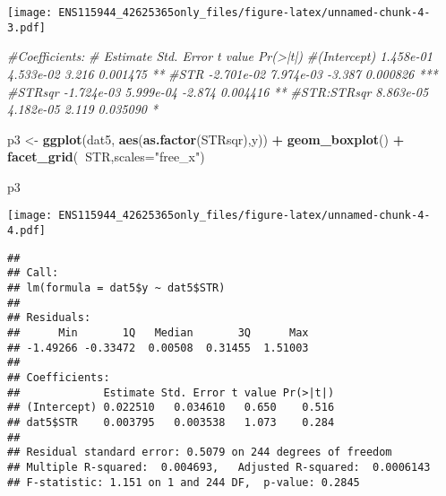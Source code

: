 \documentclass[
]{article}
\newenvironment{Shaded}{\begin{snugshade}}{\end{snugshade}}
\newcommand{\CommentTok}[1]{\textcolor[rgb]{0.56,0.35,0.01}{\textit{#1}}}
\newcommand{\DataTypeTok}[1]{\textcolor[rgb]{0.13,0.29,0.53}{#1}}
\newcommand{\KeywordTok}[1]{\textcolor[rgb]{0.13,0.29,0.53}{\textbf{#1}}}
\newcommand{\NormalTok}[1]{#1}
\newcommand{\OperatorTok}[1]{\textcolor[rgb]{0.81,0.36,0.00}{\textbf{#1}}}
\newcommand{\StringTok}[1]{\textcolor[rgb]{0.31,0.60,0.02}{#1}}
\begin{document}
\texttt{[image: ENS115944\_42625365only\_files/figure-latex/unnamed-chunk-4-3.pdf]}

\begin{Shaded}
\begin{Highlighting}[]
\CommentTok{#Coefficients:}
\CommentTok{#              Estimate Std. Error t value Pr(>|t|)    }
\CommentTok{#(Intercept)  1.458e-01  4.533e-02   3.216 0.001475 ** }
\CommentTok{#STR         -2.701e-02  7.974e-03  -3.387 0.000826 ***}
\CommentTok{#STRsqr      -1.724e-03  5.999e-04  -2.874 0.004416 ** }
\CommentTok{#STR:STRsqr   8.863e-05  4.182e-05   2.119 0.035090 * }


\NormalTok{p3 <-}\StringTok{ }\KeywordTok{ggplot}\NormalTok{(dat5, }\KeywordTok{aes}\NormalTok{(}\KeywordTok{as.factor}\NormalTok{(STRsqr),y)) }\OperatorTok{+}\StringTok{ }\KeywordTok{geom_boxplot}\NormalTok{() }\OperatorTok{+}\StringTok{ }\KeywordTok{facet_grid}\NormalTok{(}\OperatorTok{~}\NormalTok{STR,}\DataTypeTok{scales=}\StringTok{"free_x"}\NormalTok{)}

\NormalTok{p3}
\end{Highlighting}
\end{Shaded}

\texttt{[image: ENS115944\_42625365only\_files/figure-latex/unnamed-chunk-4-4.pdf]}

\begin{Shaded}
\end{Shaded}

\begin{verbatim}
## 
## Call:
## lm(formula = dat5$y ~ dat5$STR)
## 
## Residuals:
##      Min       1Q   Median       3Q      Max 
## -1.49266 -0.33472  0.00508  0.31455  1.51003 
## 
## Coefficients:
##             Estimate Std. Error t value Pr(>|t|)
## (Intercept) 0.022510   0.034610   0.650    0.516
## dat5$STR    0.003795   0.003538   1.073    0.284
## 
## Residual standard error: 0.5079 on 244 degrees of freedom
## Multiple R-squared:  0.004693,   Adjusted R-squared:  0.0006143 
## F-statistic: 1.151 on 1 and 244 DF,  p-value: 0.2845
\end{verbatim}
\end{document}
